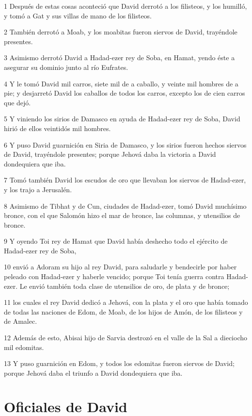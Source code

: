 \par 1 Después de estas cosas aconteció que David derrotó a los filisteos, y los humilló, y tomó a Gat y sus villas de mano de los filisteos.
\par 2 También derrotó a Moab, y los moabitas fueron siervos de David, trayéndole presentes.
\par 3 Asimismo derrotó David a Hadad-ezer rey de Soba, en Hamat, yendo éste a asegurar su dominio junto al río Eufrates.
\par 4 Y le tomó David mil carros, siete mil de a caballo, y veinte mil hombres de a pie; y desjarretó David los caballos de todos los carros, excepto los de cien carros que dejó.
\par 5 Y viniendo los sirios de Damasco en ayuda de Hadad-ezer rey de Soba, David hirió de ellos veintidós mil hombres.
\par 6 Y puso David guarnición en Siria de Damasco, y los sirios fueron hechos siervos de David, trayéndole presentes; porque Jehová daba la victoria a David dondequiera que iba.
\par 7 Tomó también David los escudos de oro que llevaban los siervos de Hadad-ezer, y los trajo a Jerusalén.
\par 8 Asimismo de Tibhat y de Cun, ciudades de Hadad-ezer, tomó David muchísimo bronce, con el que Salomón hizo el mar de bronce, las columnas, y utensilios de bronce. 
\par 9 Y oyendo Toi rey de Hamat que David había deshecho todo el ejército de Hadad-ezer rey de Soba,
\par 10 envió a Adoram su hijo al rey David, para saludarle y bendecirle por haber peleado con Hadad-ezer y haberle vencido; porque Toi tenía guerra contra Hadad-ezer. Le envió también toda clase de utensilios de oro, de plata y de bronce;
\par 11 los cuales el rey David dedicó a Jehová, con la plata y el oro que había tomado de todas las naciones de Edom, de Moab, de los hijos de Amón, de los filisteos y de Amalec.
\par 12 Además de esto, Abisai hijo de Sarvia destrozó en el valle de la Sal a dieciocho mil edomitas. 
\par 13 Y puso guarnición en Edom, y todos los edomitas fueron siervos de David; porque Jehová daba el triunfo a David dondequiera que iba.

\section*{Oficiales de David}

